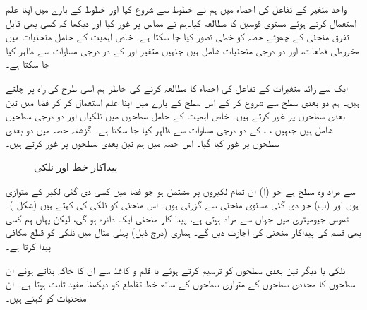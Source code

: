 واحد متغیر کے تفاعل کی احصاء میں  ہم  نے خطوط سے شروع کیا اور خطوط کے بارے میں اپنا علم  استعمال کرتے ہوئے مستوی قوسین کا مطالعہ کیا۔ہم نے مماس پر غور کیا اور دیکھا کہ  کسی بھی قابل تفرق  منحنی    کے چھوٹے حصہ کو خطی تصور کیا جا سکتا ہے۔ خاص  اہمیت کے حامل منحنیات میں مخروطی قطعات، اور دو درجی منحنیات شامل ہیں جنہیں  متغیر  اور  کے دو درجی مساوات سے ظاہر کیا جا سکتا ہے۔

ایک سے زائد متغیرات   کے تفاعل کی احصاء  کا مطالعہ کرنے کی خاطر ہم اسی طرح کی راہ پر چلتے ہیں۔ ہم  دو بعدی سطح سے شروع کر کے اس سطح کے بارے میں اپنا علم استعمال کر کر  فضا میں تین بعدی سطحوں پر غور کرتے ہیں۔ خاص اہمیت کے حامل سطحوں میں نلکیاں اور دو درجی سطحیں شامل ہیں جنہیں ، ،  کے دو درجی مساوات سے ظاہر کیا جا سکتا ہے۔ گزشتہ حصہ میں  دو بعدی سطحوں پر غور کیا گیا۔ اس حصہ میں ہم تین بعدی سطحوں پر غور کرتے ہیں۔
\begin{figure}
\centering
{}
\caption{پیداکار خط اور نلکی}
\label{شکل_سمتیہ_پیداکار_خط_اور_نلکی}
\end{figure}

 سے مراد وہ سطح ہے   جو (ا) ان تمام لکیروں پر مشتمل ہو جو فضا میں کسی دی گئی  لکیر کے متوازی ہوں اور (ب)  جو دی گئی    مستوی منحنی سے گزرتی  ہوں۔  اس منحنی کو نلکی کی   کہتے ہیں (شکل )۔ ٹھوس جیومیٹری میں   جہاں  سے مراد  ہوتی ہے، پیدا کار منحنی ایک دائرہ ہو گی، لیکن یہاں ہم کسی بھی قسم کی پیداکار منحنی کی اجازت دیں گے۔ ہماری (درج ذیل) پہلی مثال میں  نلکی کو قطع مکافی پیدا کرتا ہے۔ 
 
نلکی یا دیگر تین بعدی سطحوں کو ترسیم کرتے ہوئے یا قلم و کاغذ سے  ان کا خاکہ بناتے ہوئے   ان سطحوں کا محددی سطحوں  کے متوازی سطحوں کے ساتھ خط تقاطع کو دیکھنا مفید ثابت ہوتا ہے۔ ان  منحنیات کو    کہتے ہیں۔

